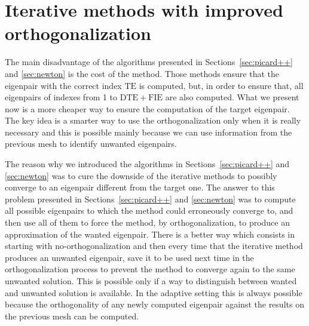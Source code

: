 \documentclass[smallextended]{svjour3}
\begin{document}
\begin{algorithm}[!ht]
\begin{algorithmic}



\ENDFOR
{}

\end{algorithmic}
\end{algorithm}

\section{Iterative methods with improved orthogonalization}\label{sec:imp_ortho}

The main disadvantage of the algorithms presented in Sections~\ref{sec:picard++} and \ref{sec:newton} is the cost of the method. Those methods ensure that the eigenpair with the correct index $\mathrm{TE}$ is computed, but, in order to ensure that, all eigenpairs of indexes from 1 to $\mathrm{DTE}+\mathrm{FIE}$ are also computed. What we present now is a more cheaper way to ensure the computation of the target eigenpair. The key idea is a smarter way to use the orthogonalization only when it is really necessary and this is possible mainly because we can use information from the previous mesh to identify unwanted eigenpairs.

The reason why we introduced the algorithms in Sections~\ref{sec:picard++} and \ref{sec:newton} was to cure the downside of the iterative methods to possibly converge to an eigenpair different from the target one. The answer to this problem presented in Sections~\ref{sec:picard++} and \ref{sec:newton} was to compute all possible eigenpairs to which the method could erroneously converge to, and then use all of them to force the method, by orthogonalization, to produce an approximation of the wanted eigenpair. There is a better way which consists in starting with no-orthogonalization and then every time that the iterative method produces an unwanted eigenpair, save it to be used next time in the orthogonalization process to prevent the method to converge again to the same unwanted solution. This is possible only if a way to distinguish between wanted and unwanted solution is available. In the adaptive setting this is always possible because  the orthogonality of any newly computed eigenpair against the results on the previous mesh can be computed.
\end{document}
